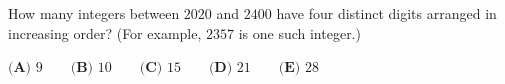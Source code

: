 How many integers between $2020$ and $2400$ have four distinct digits arranged in increasing order? (For example, $2357$ is one such integer.)

$\textbf{(A) }9 \qquad \textbf{(B) }10 \qquad \textbf{(C) }15 \qquad \textbf{(D) }21 \qquad \textbf{(E) }28$
